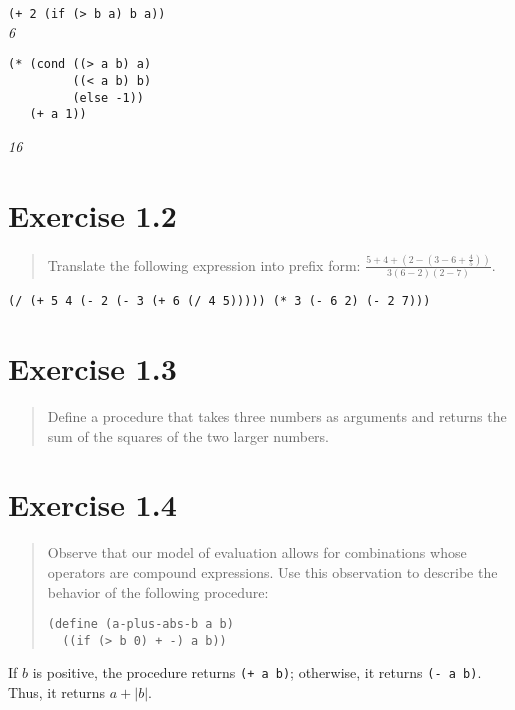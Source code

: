 \documentclass{article}
\begin{document}
\noindent \lstinline|(+ 2 (if (> b a) b a))| \\
\emph{6}

\begin{lstlisting}
(* (cond ((> a b) a)
         ((< a b) b)
         (else -1))
   (+ a 1))
\end{lstlisting}
\emph{16}

\section{Exercise 1.2}
\begin{quote}
    Translate the following expression into prefix form:
    \begin{math}
        \frac{5+4+(2-(3-6+\frac{4}{5}))}{3(6-2)(2-7)}
    \end{math}.
\end{quote}

\lstinline|(/ (+ 5 4 (- 2 (- 3 (+ 6 (/ 4 5))))) (* 3 (- 6 2) (- 2 7)))|

\section{Exercise 1.3}
\begin{quote}
	Define a procedure that takes three numbers as arguments and returns the sum
	of the squares of the two larger numbers.
\end{quote}



\section{Exercise 1.4}
\begin{quote}
	Observe that our model of evaluation allows for combinations whose operators
    are compound expressions. Use this observation to describe the behavior of
    the following procedure:
    \begin{lstlisting}
(define (a-plus-abs-b a b)
  ((if (> b 0) + -) a b))
    \end{lstlisting}
\end{quote}

If $b$ is positive, the procedure returns \lstinline|(+ a b)|;
otherwise, it returns \lstinline|(- a b)|. Thus, it returns $a + |b|$.
\end{document}
